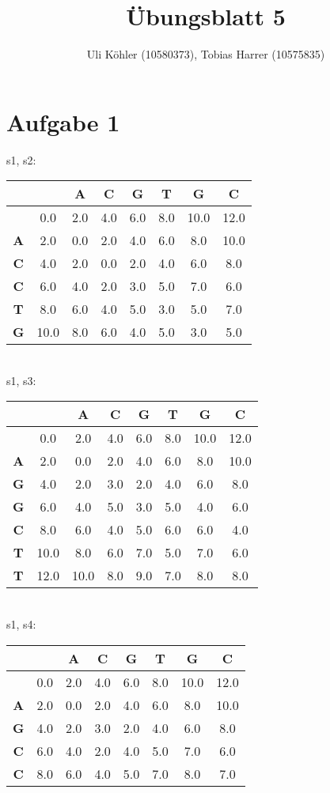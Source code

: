 \documentclass[a4paper,10pt,oneside,reqno]{scrartcl}
\title{Übungsblatt 5}
\author{Uli Köhler (10580373), Tobias Harrer (10575835)}
\begin{document}
\maketitle

\section*{Aufgabe 1}%
s1, s2: \\
\begin{tabular}{c|ccccccc}
& \textbf{ } & \textbf{A} & \textbf{C} & \textbf{G} & \textbf{T} & \textbf{G} & \textbf{C}\\\hline
\textbf{ } & 0.0 & 2.0 & 4.0 & 6.0 & 8.0 & 10.0 & 12.0\\
\textbf{A} & 2.0 & 0.0 & 2.0 & 4.0 & 6.0 & 8.0 & 10.0\\
\textbf{C} & 4.0 & 2.0 & 0.0 & 2.0 & 4.0 & 6.0 & 8.0\\
\textbf{C} & 6.0 & 4.0 & 2.0 & 3.0 & 5.0 & 7.0 & 6.0\\
\textbf{T} & 8.0 & 6.0 & 4.0 & 5.0 & 3.0 & 5.0 & 7.0\\
\textbf{G} & 10.0 & 8.0 & 6.0 & 4.0 & 5.0 & 3.0 & 5.0\\
\end{tabular}
\\[2mm]s1, s3: \\
\begin{tabular}{c|ccccccc}
& \textbf{ } & \textbf{A} & \textbf{C} & \textbf{G} & \textbf{T} & \textbf{G} & \textbf{C}\\\hline
\textbf{ } & 0.0 & 2.0 & 4.0 & 6.0 & 8.0 & 10.0 & 12.0\\
\textbf{A} & 2.0 & 0.0 & 2.0 & 4.0 & 6.0 & 8.0 & 10.0\\
\textbf{G} & 4.0 & 2.0 & 3.0 & 2.0 & 4.0 & 6.0 & 8.0\\
\textbf{G} & 6.0 & 4.0 & 5.0 & 3.0 & 5.0 & 4.0 & 6.0\\
\textbf{C} & 8.0 & 6.0 & 4.0 & 5.0 & 6.0 & 6.0 & 4.0\\
\textbf{T} & 10.0 & 8.0 & 6.0 & 7.0 & 5.0 & 7.0 & 6.0\\
\textbf{T} & 12.0 & 10.0 & 8.0 & 9.0 & 7.0 & 8.0 & 8.0\\
\end{tabular}
\\[2mm]s1, s4: \\
\begin{tabular}{c|ccccccc}
& \textbf{ } & \textbf{A} & \textbf{C} & \textbf{G} & \textbf{T} & \textbf{G} & \textbf{C}\\\hline
\textbf{ } & 0.0 & 2.0 & 4.0 & 6.0 & 8.0 & 10.0 & 12.0\\
\textbf{A} & 2.0 & 0.0 & 2.0 & 4.0 & 6.0 & 8.0 & 10.0\\
\textbf{G} & 4.0 & 2.0 & 3.0 & 2.0 & 4.0 & 6.0 & 8.0\\
\textbf{C} & 6.0 & 4.0 & 2.0 & 4.0 & 5.0 & 7.0 & 6.0\\
\textbf{C} & 8.0 & 6.0 & 4.0 & 5.0 & 7.0 & 8.0 & 7.0\\
\end{tabular}
\end{document}
